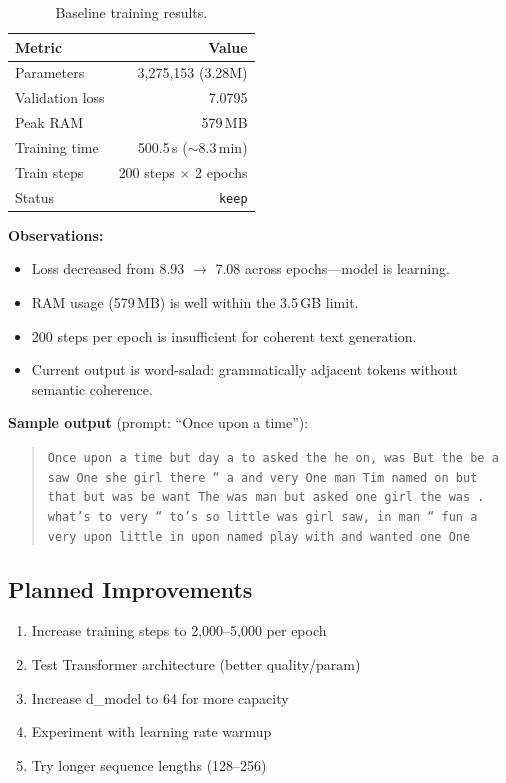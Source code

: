 \documentclass[11pt,a4paper]{article}
\begin{document}
\begin{table}[h]
\centering
\begin{tabular}{@{}lr@{}}
\toprule
\textbf{Metric} & \textbf{Value} \\
\midrule
Parameters & 3,275,153 (3.28M) \\
Validation loss & 7.0795 \\
Peak RAM & 579\,MB \\
Training time & 500.5\,s ($\sim$8.3\,min) \\
Train steps & 200 steps $\times$ 2 epochs \\
Status & \texttt{keep} \\
\bottomrule
\end{tabular}
\caption{Baseline training results.}
\end{table}

\textbf{Observations:}
\begin{itemize}
  \item Loss decreased from 8.93 $\to$ 7.08 across epochs---model is learning.
  \item RAM usage (579\,MB) is well within the 3.5\,GB limit.
  \item 200 steps per epoch is insufficient for coherent text generation.
  \item Current output is word-salad: grammatically adjacent tokens without semantic coherence.
\end{itemize}

\textbf{Sample output} (prompt: ``Once upon a time''):
\begin{quote}
\texttt{Once upon a time but day a to asked the he on, was But the be a saw One she girl there `` a and very One man Tim named on but that but was be want The was man but asked one girl the was . what's to very `` to's so little was girl saw, in man `` fun a very upon little in upon named play with and wanted one One}
\end{quote}

\subsection{Planned Improvements}

\begin{enumerate}
  \item Increase training steps to 2,000--5,000 per epoch
  \item Test Transformer architecture (better quality/param)
  \item Increase d\_model to 64 for more capacity
  \item Experiment with learning rate warmup
  \item Try longer sequence lengths (128--256)
\end{enumerate}
\end{document}
